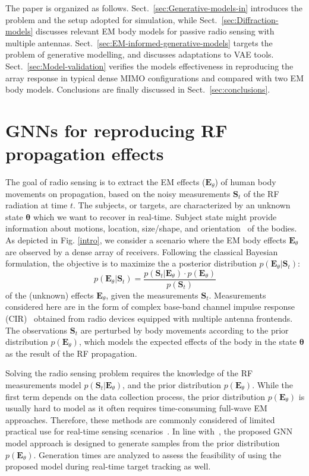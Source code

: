 The paper is organized as follows. Sect.~\ref{sec:Generative-models-in} introduces the problem and the setup adopted for simulation, while Sect.~\ref{sec:Diffraction-models} discusses relevant EM body models for passive radio sensing with multiple antennas. Sect.~\ref{sec:EM-informed-generative-models} targets the problem of generative modelling, and discusses adaptations to VAE tools. Sect.~\ref{sec:Model-validation} verifies the models effectiveness in reproducing the array response in typical dense MIMO configurations and compared with two EM body models. Conclusions are finally discussed in Sect.~\ref{sec:conclusions}.

\section{GNNs for reproducing RF propagation effects\label{sec:Generative-models-in}}

The goal of radio sensing is to extract the EM effects ($\mathbf{E}_{\theta}$) of human body movements on propagation, based on the noisy measurements $\mathbf{S}_{t}$ of the RF radiation at time $t$. The subjects, or targets, are characterized by an unknown state $\mathbf{\theta}$ which we want to recover in real-time. Subject state might provide information about motions, location, size/shape, and orientation~\cite{kat,rampa-2017,rampa-2022a} of the bodies. As depicted in Fig. \ref{intro}, we consider a scenario where the EM body effects $\mathbf{E}_{\theta}$ are observed by a dense array of receivers. Following the classical Bayesian formulation, the objective is to maximize the a posterior distribution $p(\mathbf{E}_{\theta}|\mathbf{S}_{t})$:
\begin{equation}
p(\mathbf{E}_{\theta}|\mathbf{S}_{t})=\frac{p(\mathbf{S}_{t}|\mathcal{\mathbf{E}_{\theta}})\cdot p(\mathbf{E}_{\theta})}{p(\mathbf{S}_{t})}\label{eq:post}
\end{equation}
of the (unknown) effects $\mathbf{E}_{\theta}$, given the measurements $\mathbf{S}_{t}$. Measurements considered here are in the form of complex base-band channel impulse response (CIR)~\cite{savazzi-2016} obtained from radio devices equipped with multiple antenna frontends. The observations $\mathbf{S}_{t}$ are perturbed by body movements according to the prior distribution $p(\mathbf{E}_{\theta})$, which models the expected effects of the body in the state $\mathbf{\theta}$ as the result of the RF propagation.

Solving the radio sensing problem requires the knowledge of the RF measurements model $p(\mathbf{S}_{t}|\mathbf{E}_{\theta})$, and the prior distribution $p(\mathbf{E}_{\theta})$. While the first term depends on the data collection process, the prior distribution $p(\mathcal{\mathbf{E}_{\theta}})$ is usually hard to model as it often requires time-consuming full-wave EM approaches. Therefore, these methods are commonly considered of limited practical use for real-time sensing scenarios~\cite{eleryan-2011}. In line with~\cite{generation}, the proposed GNN model approach is designed to generate samples from the prior distribution $p(\mathcal{\mathbf{E}_{\theta}})$. Generation times are analyzed to assess the feasibility of using the proposed model during real-time target tracking as well. 

